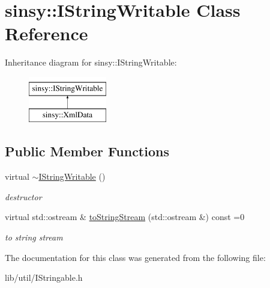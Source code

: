 \hypertarget{classsinsy_1_1IStringWritable}{\section{sinsy\-:\-:\-I\-String\-Writable \-Class \-Reference}
\label{classsinsy_1_1IStringWritable}
}
\-Inheritance diagram for sinsy\-:\-:\-I\-String\-Writable\-:\begin{figure}[H]
\begin{center}
\leavevmode
\includegraphics[height=2.000000cm]{classsinsy_1_1IStringWritable}
\end{center}
\end{figure}
\subsection*{\-Public \-Member \-Functions}
\begin{DoxyCompactItemize}
\item 
\hypertarget{classsinsy_1_1IStringWritable_a4c6d1dbf3c60947b427be8e0cae937da}{virtual \hyperlink{classsinsy_1_1IStringWritable_a4c6d1dbf3c60947b427be8e0cae937da}{$\sim$\-I\-String\-Writable} ()}\label{classsinsy_1_1IStringWritable_a4c6d1dbf3c60947b427be8e0cae937da}

\begin{DoxyCompactList}\small\item\em destructor \end{DoxyCompactList}\item 
\hypertarget{classsinsy_1_1IStringWritable_a044c5bb33002dacec9bbdbf2dc0fbe23}{virtual std\-::ostream \& \hyperlink{classsinsy_1_1IStringWritable_a044c5bb33002dacec9bbdbf2dc0fbe23}{to\-String\-Stream} (std\-::ostream \&) const =0}\label{classsinsy_1_1IStringWritable_a044c5bb33002dacec9bbdbf2dc0fbe23}

\begin{DoxyCompactList}\small\item\em to string stream \end{DoxyCompactList}\end{DoxyCompactItemize}


\-The documentation for this class was generated from the following file\-:\begin{DoxyCompactItemize}
\item 
lib/util/\-I\-Stringable.\-h\end{DoxyCompactItemize}
